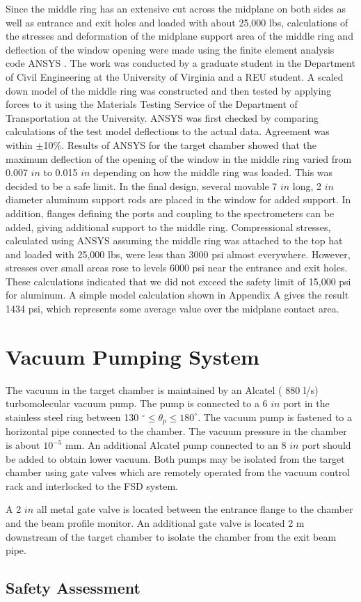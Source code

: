 {Since the middle ring has an extensive cut across the midplane on both sides as
well as
entrance and exit holes and loaded with about 25,000 lbs, calculations of the
stresses
 and deformation of  the
midplane support area of the middle ring and deflection of the window opening
were made using the finite element analysis code ANSYS . The work was conducted
by a graduate student in the Department of Civil Engineering at the
University of
Virginia and a REU student.  A scaled down model of the middle ring was
constructed and then tested by applying forces to it using the Materials Testing
Service of the Department of Transportation at the University. ANSYS was first
checked by comparing calculations of the test model deflections to the actual
data. Agreement was  within $\pm$10\%. Results of ANSYS for the target
chamber showed that the maximum deflection of the opening of the window in the
middle ring varied from 0.007 $in$ to 0.015 $in$ depending on how the
middle ring
was loaded. This was decided to be a safe limit. In the final design, several
movable
7 $in$ long, 2 $in$ diameter aluminum support rods are placed in the
window for added support. In addition, flanges defining the ports and
coupling to
the spectrometers can be added, giving additional support to the middle ring.
Compressional stresses, calculated using ANSYS assuming the middle ring was
attached to the
top hat and loaded with 25,000 lbs, were less than 3000 psi 
almost everywhere.
However, stresses over small areas rose to levels 6000 psi near the entrance
and exit holes. These calculations indicated that we did not exceed the safety
limit of 15,000 psi for aluminum. A simple model calculation shown in Appendix
A  gives the result 1434 psi, which represents some average value over the
midplane
contact area.

\section{Vacuum Pumping System}

The vacuum in the target chamber is maintained by an Alcatel ( 880 l/s)
 turbomolecular vacuum pump. The pump is connected to a 6 $in$ port in the
stainless steel ring between 130
 $^\circ \le \theta_p \le 180 ^\circ$. The vacuum pump is
fastened to a horizontal pipe connected to the chamber. The vacuum pressure in
the chamber is about $10^{-5}$ mm. An additional Alcatel pump connected
to an 8 $in$ port should be added to obtain lower vacuum. Both
pumps may be isolated
from the target chamber using gate valves which are remotely operated
from the vacuum control rack and interlocked to the FSD system.


A 2 $in$ all metal gate valve is located between the entrance flange to the
chamber and the beam profile monitor.   
 An additional gate valve is located 2 m downstream of the
 target chamber to isolate the chamber from the exit beam pipe.
}
\begin{safetyen}{10}{15}
\section{Safety Assessment}
\end{safetyen}

